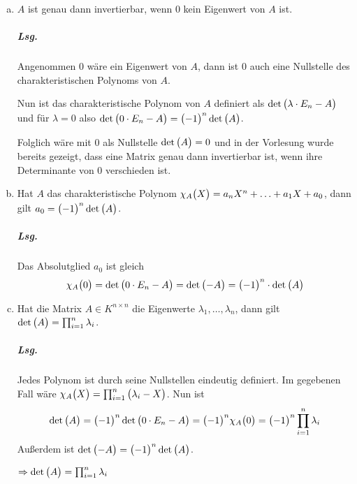 \documentclass{scrreprt}
\begin{document}
\begin{enumerate}[(a)]
\item $A$ ist genau dann invertierbar, wenn $0$ kein Eigenwert von $A$ ist.

  \subparagraph{Lsg.} Angenommen 0 wäre ein Eigenwert von $A$, dann ist $0$ auch
  eine Nullstelle des charakteristischen Polynoms von $A$.

  Nun ist das charakteristische Polynom von $A$ definiert als
  $\det\qty\big(\lambda \cdot E_n - A)$ und für $\lambda = 0$ also
  $\det\qty\big(0 \cdot E_n - A) = \qty\big(-1)^n \det\qty\big(A)$.

  Folglich wäre mit 0 als Nullstelle $\det\qty\big(A) = 0$ und in der Vorlesung
  wurde bereits gezeigt, dass eine Matrix genau dann invertierbar ist, wenn ihre
  Determinante von 0 verschieden ist.

\item Hat $A$ das charakteristische Polynom
  $\chi_A\qty\big(X) = a_nX^n + \ldots + a_1X + a_0$, dann gilt
  $a_0 = \qty\big(-1)^n\det\qty\big(A)$.

  \subparagraph{Lsg.} Das Absolutglied $a_0$ ist gleich
  \[
    \chi_A\qty\big(0) = \det\qty\big(0 \cdot E_n - A)
    = \det\qty\big(-A) = \qty\big(-1)^n \cdot \det\qty\big(A)
  \]

\item Hat die Matrix $A \in K^{n \times n}$ die Eigenwerte
  $\lambda_1, \ldots, \lambda_n$, dann gilt
  $\det\qty\big(A) = \prod_{i = 1}^n \lambda_i$.

  \subparagraph{Lsg.} Jedes Polynom ist durch seine Nullstellen eindeutig
  definiert.
  Im gegebenen Fall wäre
  $\chi_A\qty\big(X) = \prod_{i = 1}^n\qty\big(\lambda_i - X)$.
  Nun ist
  \[
    \det\qty\big(A) = \qty\big(-1)^n \det\qty\big(0 \cdot E_n - A) =
    \qty\big(-1)^n \chi_A\qty\big(0) = \qty\big(-1)^n \prod_{i = 1}^n \lambda_i
  \]
  Außerdem ist $\det\qty\big(-A) = \qty\big(-1)^n \det\qty\big(A)$.

  $\Rightarrow \det\qty\big(A) = \prod_{i = 1}^n \lambda_i$
\end{enumerate}
\end{document}
